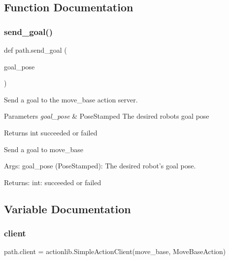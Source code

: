 \subsection{Function Documentation}
\mbox{\label{namespacepath_a2db4ca25204e9a7df7493344494d5a10}} 
\subsubsection{\texorpdfstring{send\+\_\+goal()}{send\_goal()}}
{\footnotesize\ttfamily def path.\+send\+\_\+goal (\begin{DoxyParamCaption}\item[{}]{goal\+\_\+pose }\end{DoxyParamCaption})}



Send a goal to the move\+\_\+base action server. 


\begin{DoxyParams}{Parameters}
{\em goal\+\_\+pose} & Pose\+Stamped The desired robot\textquotesingle{}s goal pose \\
\hline
\end{DoxyParams}
\begin{DoxyReturn}{Returns}
int succeeded or failed \begin{DoxyVerb}Send a goal to move_base

Args:
goal_pose (PoseStamped): The desired robot's goal pose.

Returns:
int: succeeded or failed
\end{DoxyVerb}
 
\end{DoxyReturn}


\subsection{Variable Documentation}
\mbox{\label{namespacepath_afeeab767bfbbb7e3c54d5df73bfdb8d8}} 
\subsubsection{\texorpdfstring{client}{client}}
{\footnotesize\ttfamily path.\+client = actionlib.\+Simple\+Action\+Client(\textquotesingle{}move\+\_\+base\textquotesingle{}, Move\+Base\+Action)}

